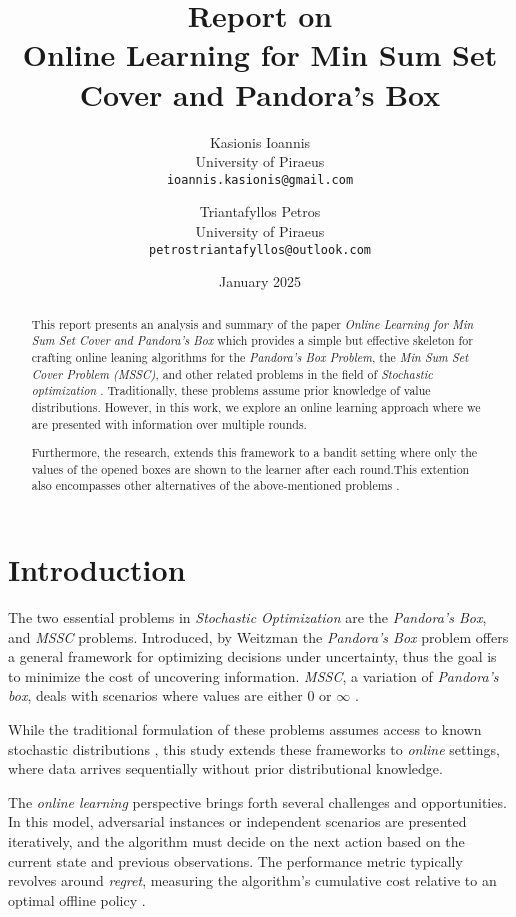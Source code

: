 \documentclass[11pt,a4paper]{article}
\title{Report on \\ \textbf{Online Learning for Min Sum Set Cover and Pandora's Box}}
\author{
    Kasionis Ioannis \\ University of Piraeus \\ \texttt{ioannis.kasionis@gmail.com}
    \and
    Triantafyllos Petros \\ University of Piraeus \\ \texttt{petrostriantafyllos@outlook.com}
}
\date{January 2025}
\begin{document}
\maketitle

\begin{abstract}
This report presents an analysis and summary of the paper \textit{Online Learning for Min Sum Set Cover and Pandora's Box} which provides a simple but effective skeleton for crafting online leaning algorithms for the \textit{Pandora's Box Problem}, the \textit{Min Sum Set Cover Problem (MSSC)}, and other related problems in the field of \textit{Stochastic optimization} \cite{gergatsouli2022online}. Traditionally, these problems assume prior knowledge of value distributions. However, in this work, we explore an online learning approach where we are presented with information over multiple rounds. \par 
Furthermore, the research, extends this framework to a bandit setting where only the values of the opened boxes are shown to the learner after each round.This extention also encompasses other alternatives of the above-mentioned problems \cite{gergatsouli2022online}.
\end{abstract}
\pagebreak

\section{Introduction}
The two essential problems in \textit{Stochastic Optimization} are the \textit{Pandora's Box}, and \textit{MSSC} problems.
Introduced, by Weitzman \cite{weitzman1978optimal} the \textit{Pandora's Box} problem offers a general framework for optimizing decisions under uncertainty, thus the goal is to minimize the cost of uncovering information.
\textit{MSSC}, a variation of \textit{Pandora's box}, deals with scenarios where values are either $0$ or $\infty$ \cite{feige2004approximating}. \par
While the traditional formulation of these problems assumes access to known stochastic distributions \cite{gergatsouli2022online}, this study extends these frameworks to \textit{online} settings, where data arrives sequentially without prior distributional knowledge. \par
The \textit{online learning} perspective brings forth several challenges and opportunities. In this model, adversarial instances or independent scenarios are presented iteratively, and the algorithm must decide on the next action based on the current state and previous observations. The performance metric typically revolves around \textit{regret}, measuring the algorithm's cumulative cost relative to an optimal offline policy \cite{shalev2012online}.
\newline
\end{document}
